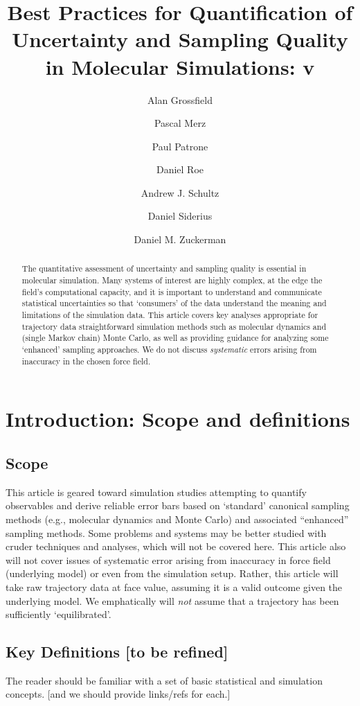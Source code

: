 \documentclass[9pt]{livecoms}
\title{Best Practices for Quantification of Uncertainty and Sampling Quality in Molecular Simulations: v\versionnumber}
\author[1*\authfn{1}]{Alan Grossfield}
\author[2*\authfn{1}]{Pascal Merz}
\author[3*\authfn{1}]{Paul Patrone}
\author[4*\authfn{1}]{Daniel Roe}
\author[5*\authfn{1}]{Andrew J. Schultz}
\author[6*\authfn{1}]{Daniel Siderius}
\author[7*\authfn{1}]{Daniel M. Zuckerman}
\affil[1]{University of Rochester Medical Center, Department of Biochemistry and Biophysics}
\affil[5]{Department of Chemical and Biological Engineering, University at Buffalo, The State University of New York}
\affil[7]{Oregon Health \& Science University}
\begin{document}
\maketitle

\begin{abstract}
The quantitative assessment of uncertainty and sampling quality is essential in molecular simulation.
Many systems of interest are highly complex, at the edge the field's computational capacity, and it is important to understand and communicate statistical uncertainties so that `consumers' of the data understand the meaning and limitations of the simulation data.
This article covers key analyses appropriate for trajectory data straightforward simulation methods such as molecular dynamics and (single Markov chain) Monte Carlo, as well as providing guidance for analyzing some `enhanced' sampling approaches.
We do not discuss \emph{systematic} errors arising from inaccuracy in the chosen force field.
\end{abstract}

\section{Introduction: Scope and definitions}

\subsection{Scope}
This article is geared toward simulation studies attempting to quantify observables and derive reliable error bars based on `standard' canonical sampling methods (e.g., molecular dynamics and Monte Carlo) and associated “enhanced” sampling methods.
Some problems and systems may be better studied with cruder techniques and analyses, which will not be covered here.
This article also will not cover issues of systematic error arising from inaccuracy in force field (underlying model) or even from the simulation setup.
Rather, this article will take raw trajectory data at face value, assuming it is a valid outcome given the underlying model.
We emphatically will \emph{not} assume that a trajectory has been sufficiently `equilibrated'.

\subsection{Key Definitions [to be refined]}
The reader should be familiar with a set of basic statistical and simulation concepts.
[and we should provide links/refs for each.]
\end{document}
